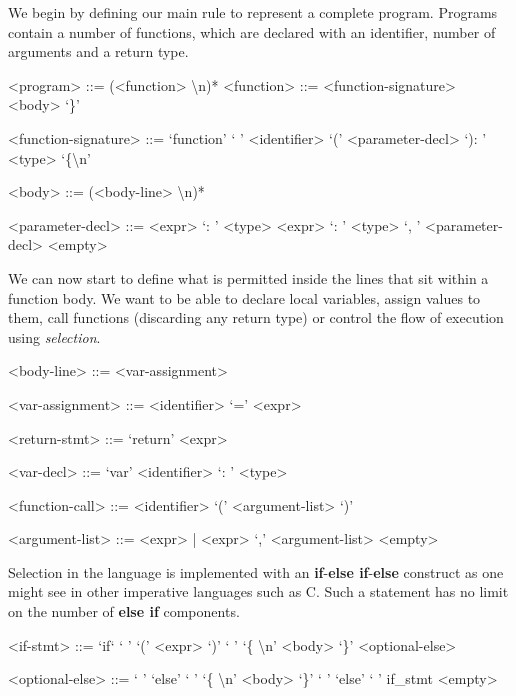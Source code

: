 \documentclass[a4paper,openany,12pt]{book}
\begin{document}
\setlength{\grammarparsep}{20pt plus 1pt minus 1pt} %
\setlength{\grammarindent}{12em} %

We begin by defining our main rule to represent a complete program.
Programs contain a number of functions, which are declared with an identifier, number of arguments and a return type.

\begin{grammar}
    <program> ::= (<function> \textbackslash n)*
    <function> ::= <function-signature> <body> `\}'

    <function-signature> ::= `function' ` ' <identifier> `(' <parameter-decl> `): ' <type> `\{\textbackslash n'

    <body> ::= (<body-line> \textbackslash n)*

    <parameter-decl> ::= <expr> `: ' <type>
    \alt <expr> `: ' <type> `, ' <parameter-decl>
    \alt <empty>
\end{grammar}

We can now start to define what is permitted inside the lines that sit within a function body.
We want to be able to declare local variables, assign values to them, call functions (discarding any return type) or
control the flow of execution using \emph{selection}.

\begin{grammar}
    <body-line> ::= <var-assignment>

    <var-assignment> ::= <identifier> `=' <expr>

    <return-stmt> ::= `return' <expr>

    <var-decl> ::= `var' <identifier> `: ' <type>

    <function-call> ::= <identifier> `(' <argument-list> `)'

    <argument-list> ::= <expr> | <expr> `,' <argument-list>
    \alt <empty>
\end{grammar}

Selection in the language is implemented with an \textbf{if}-\textbf{else if}-\textbf{else} construct
as one might see in other imperative languages such as C.
Such a statement has no limit on the number of \textbf{else if} components.

\begin{grammar}
    <if-stmt> ::= `if` ` ' `(' <expr> `)' ` ' `\{ \textbackslash n' <body> `\}' <optional-else>

    <optional-else> ::= ` ' `else' ` ' `\{ \textbackslash n' <body> `\}' \alt ` ' `else' ` ' if_stmt \alt <empty>

\end{grammar}
\end{document}

